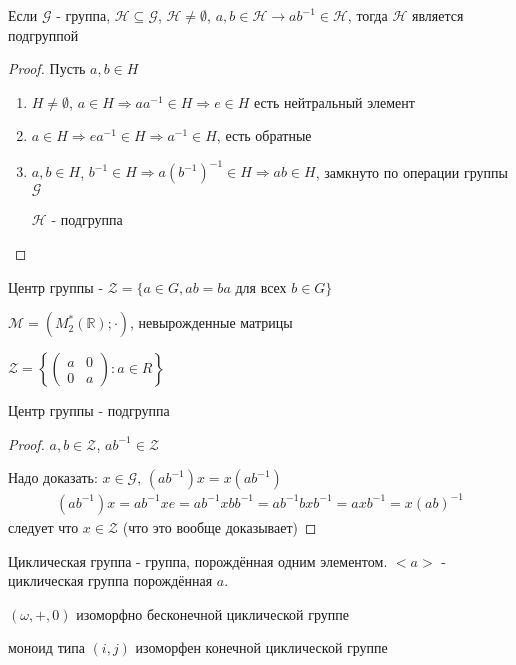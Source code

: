 \documentclass[../main/document.tex]{subfiles}
\begin{document}
\begin{thm}\label{one-step-subgroup-test}
Если $\mathcal{G}$ - группа, $\mathcal{H}\subseteq \mathcal{G}$, $\mathcal{H}\neq \emptyset$, $a,b\in \mathcal{H}\rightarrow ab^{-1}\in \mathcal{H}$, тогда $\mathcal{H}$ является подгруппой
\begin{proof}
Пусть $a,b\in H$
\begin{enumerate}
\item $H\neq \emptyset$, $a\in H\Rightarrow aa^{-1}\in H\Rightarrow e\in H$ есть нейтральный элемент
\item $a\in H\Rightarrow ea^{-1}\in H\Rightarrow a^{-1}\in H$, есть обратные
\item $a,b\in H$, $b^{-1}\in H\Rightarrow a(b^{-1})^{-1}\in H\Rightarrow ab\in H$, замкнуто по операции группы $\mathcal{G}$

$\mathcal{H}$ - подгруппа 
\end{enumerate}
\end{proof}
\end{thm}

\begin{dfn}
Центр группы - $\mathcal{Z}=\{a\in G, ab=ba \text{ для всех } b\in G\}$
\end{dfn}
\begin{exm}
$\mathcal{M}=(M^*_2(\mathbb{R});\cdot)$, невырожденные матрицы

$\mathcal{Z}= \left\{
\begin{pmatrix}a&0\\0&a\end{pmatrix}:a\in R
\right\}$
\end{exm}
\begin{thm}
Центр группы - подгруппа
\begin{proof}
$a,b\in \mathcal{Z}$, $ab^{-1}\in \mathcal{Z}$

Надо доказать: $x\in \mathcal{G}$, $(ab^{-1})x=x(ab^{-1})$
\begin{multline*}
(ab^{-1})x=ab^{-1}xe=ab^{-1}xbb^{-1}=ab^{-1}bxb^{-1}=axb^{-1}=x(ab)^{-1}
\end{multline*}
следует что $x\in \mathcal{Z}$ (что это вообще доказывает)
\end{proof}
\end{thm}

\begin{dfn}
Циклическая группа - группа, порождённая одним элементом. $<a>$ - циклическая группа порождённая $a$.

$(\omega,+,0)$ изоморфно бесконечной циклической группе

моноид типа $(i,j)$ изоморфен конечной циклической группе
\end{dfn}
\end{document}
